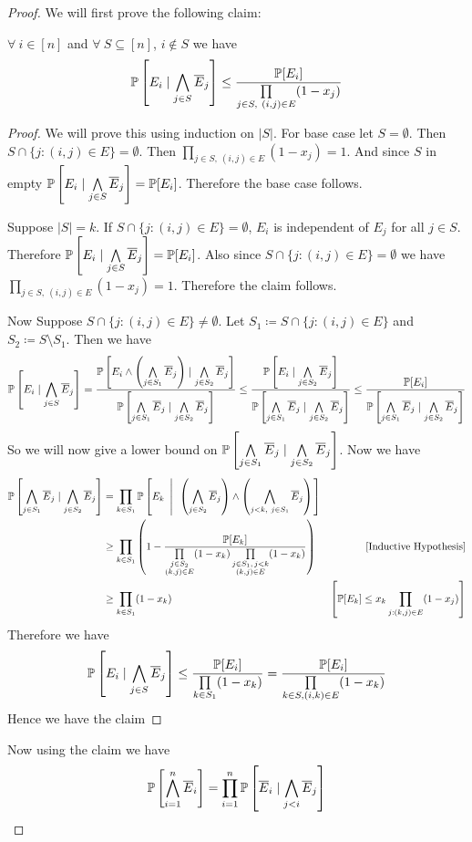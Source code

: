 \begin{proof}
	We will first prove the following claim:\begin{claimwidth}
		\begin{claim}{}{}
			$\forall\ i\in[n]$ and $\forall\ S\subseteq[n]$, $i\notin S$ we have $$\mathbb{P}\left[E_i\mid \bigwedge_{j\in S}\overline{E}_j\right]\leq\frac{\mathbb{P}[E_i]}{\prod\limits_{j\in S,\ (i,j)\in E}(1-x_j)}$$
		\end{claim}
	\begin{proof}
		We will prove this using induction on $|S|$. For base case let $S=\emptyset$. Then $S\cap\{j\colon (i,j)\in E\}=\emptyset$. Then $\prod\limits_{j\in S,\ (i,j)\in E}(1-x_j)=1$. And since $S$ in empty $\mathbb{P}\left[E_i\mid \bigwedge\limits_{j\in S}\overline{E}_j\right]=\mathbb{P}[E_i]$. Therefore the base case follows. \parinn
		
		Suppose $|S|=k$. If $S\cap\{j\colon (i,j)\in E\}=\emptyset$, $E_i$ is independent of $E_j$ for all $j\in S$. Therefore $\mathbb{P}\left[E_i\mid \bigwedge\limits_{j\in S}\overline{E}_j\right]=\mathbb{P}[E_i]$. Also since $S\cap\{j\colon (i,j)\in E\}=\emptyset$ we have $\prod\limits_{j\in S,\ (i,j)\in E}(1-x_j)=1$. Therefore the claim follows.
		
		Now Suppose $S\cap\{j\colon (i,j)\in E\}\neq\emptyset$. Let $S_1\coloneqq S\cap\{j\colon (i,j)\in E\}$ and $S_2\coloneqq S\setminus S_1$. Then we have $$\mathbb{P}\left[E_i\mid \bigwedge_{j\in S}\overline{E}_j\right]=\frac{\mathbb{P}\left[ E_i\wedge \left( \bigwedge\limits_{j\in S_1}\overline{E}_j\right)\mid \bigwedge\limits_{j\in S_2}\overline{E}_j \right]}{\mathbb{P}\left[  \bigwedge\limits_{j\in S_1}\overline{E}_j\mid \bigwedge\limits_{j\in S_2}\overline{E}_j \right]}\leq \frac{\mathbb{P}\left[ E_i\mid \bigwedge\limits_{j\in S_2}\overline{E}_j \right]}{\mathbb{P}\left[  \bigwedge\limits_{j\in S_1}\overline{E}_j\mid \bigwedge\limits_{j\in S_2}\overline{E}_j \right]}\leq\frac{\mathbb{P}[ E_i]}{\mathbb{P}\left[  \bigwedge\limits_{j\in S_1}\overline{E}_j\mid \bigwedge\limits_{j\in S_2}\overline{E}_j \right]} $$So we will now give a lower bound on $\mathbb{P}\left[  \bigwedge\limits_{j\in S_1}\overline{E}_j\mid \bigwedge\limits_{j\in S_2}\overline{E}_j \right]$. Now we have \begin{align*}
			\mathbb{P}\left[  \bigwedge\limits_{j\in S_1}\overline{E}_j\mid \bigwedge\limits_{j\in S_2}\overline{E}_j \right] & = \prod_{k\in S_1}\mathbb{P}\left[ E_k\ \left|\ \ \left(\bigwedge_{j\in S_2}\overline{E}_j\right) \wedge \left( \bigwedge_{j<k,\ j\in S_1}\overline{E}_j\right) \right.  \right]\\
			& \geq \prod_{k\in S_1} \left(1-\frac{\mathbb{P}[E_k]}{\prod\limits_{\substack{j\in S_2\\ (k,j)\in E}}(1-x_k)  \prod\limits_{\substack{j\in S_1,\, j<k\\ (k,j)\in E}}(1-x_k)  }   \right) &[\text{Inductive Hypothesis}]\\
			& \geq \prod_{k\in S_1}(1-x_k)& \left[\mathbb{P}[E_k]\leq x_k\prod_{j:(k,j)\in E}(1-x_j)\right]
		\end{align*}Therefore we have $$\mathbb{P}\left[E_i\mid \bigwedge_{j\in S}\overline{E}_j\right]\leq \frac{\mathbb{P}[E_i]}{\prod\limits_{k\in S_1}(1-x_k)}=\frac{\mathbb{P}[E_i]}{\prod\limits_{k\in S,(i,k)\in E}(1-x_k)}$$Hence we have the claim	\end{proof}
	\end{claimwidth}
Now using the claim we have $$\mathbb{P}\left[ \bigwedge_{i=1}^n\overline{E}_i \right]=\prod_{i=1}^n\mathbb{P}\left[ \overline{E}_i\mid\bigwedge_{j<i}\overline{E}_j \right]$$
\end{proof}

